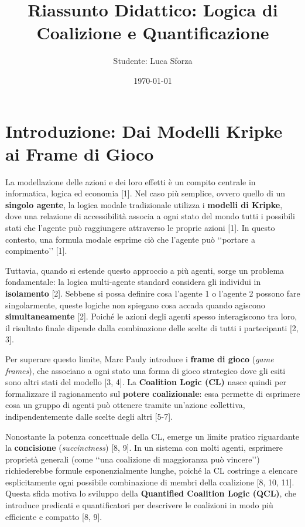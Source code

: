 \documentclass[12pt]{article}
\title{Riassunto Didattico: Logica di Coalizione e Quantificazione}
\author{Studente: Luca Sforza}
\date{\today}
\begin{document}
\maketitle


\section{Introduzione: Dai Modelli Kripke ai Frame di Gioco}
La modellazione delle azioni e dei loro effetti è un compito centrale in informatica, logica ed economia [1]. Nel caso più semplice, ovvero quello di un \textbf{singolo agente}, la logica modale tradizionale utilizza i \textbf{modelli di Kripke}, dove una relazione di accessibilità associa a ogni stato del mondo tutti i possibili stati che l'agente può raggiungere attraverso le proprie azioni [1]. In questo contesto, una formula modale esprime ciò che l'agente può \lq\lq{}portare a compimento\rq\rq{} [1].

Tuttavia, quando si estende questo approccio a più agenti, sorge un problema fondamentale: la logica multi-agente standard considera gli individui in \textbf{isolamento} [2]. Sebbene si possa definire cosa l'agente 1 o l'agente 2 possono fare singolarmente, queste logiche non spiegano cosa accada quando agiscono \textbf{simultaneamente} [2]. Poiché le azioni degli agenti spesso interagiscono tra loro, il risultato finale dipende dalla combinazione delle scelte di tutti i partecipanti [2, 3].

Per superare questo limite, Marc Pauly introduce i \textbf{frame di gioco} (\textit{game frames}), che associano a ogni stato una forma di gioco strategico dove gli esiti sono altri stati del modello [3, 4]. La \textbf{Coalition Logic (CL)} nasce quindi per formalizzare il ragionamento sul \textbf{potere coalizionale}: essa permette di esprimere cosa un gruppo di agenti può ottenere tramite un'azione collettiva, indipendentemente dalle scelte degli altri [5-7].

Nonostante la potenza concettuale della CL, emerge un limite pratico riguardante la \textbf{concisione} (\textit{succinctness}) [8, 9]. In un sistema con molti agenti, esprimere proprietà generali (come \lq\lq{}una coalizione di maggioranza può vincere\rq\rq{}) richiederebbe formule esponenzialmente lunghe, poiché la CL costringe a elencare esplicitamente ogni possibile combinazione di membri della coalizione [8, 10, 11]. Questa sfida motiva lo sviluppo della \textbf{Quantified Coalition Logic (QCL)}, che introduce predicati e quantificatori per descrivere le coalizioni in modo più efficiente e compatto [8, 9].
\end{document}
